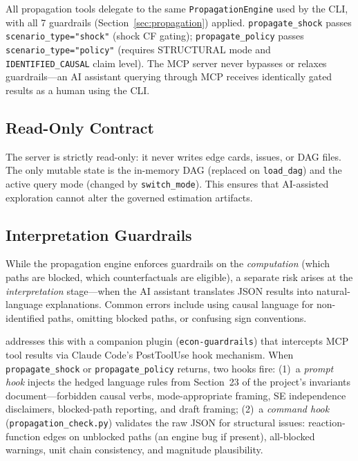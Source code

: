 \documentclass{article}
\begin{document}
All propagation tools delegate to the same \texttt{PropagationEngine} used by the CLI, with all 7 guardrails (Section~\ref{sec:propagation}) applied. \texttt{propagate\_shock} passes \texttt{scenario\_type="shock"} (shock CF gating); \texttt{propagate\_policy} passes \texttt{scenario\_type="policy"} (requires STRUCTURAL mode and \texttt{IDENTIFIED\_CAUSAL} claim level). The MCP server never bypasses or relaxes guardrails---an AI assistant querying through MCP receives identically gated results as a human using the CLI.

\subsection{Read-Only Contract}

The server is strictly read-only: it never writes edge cards, issues, or DAG files. The only mutable state is the in-memory DAG (replaced on \texttt{load\_dag}) and the active query mode (changed by \texttt{switch\_mode}). This ensures that AI-assisted exploration cannot alter the governed estimation artifacts.

\subsection{Interpretation Guardrails}

While the propagation engine enforces guardrails on the \emph{computation} (which paths are blocked, which counterfactuals are eligible), a separate risk arises at the \emph{interpretation} stage---when the AI assistant translates JSON results into natural-language explanations. Common errors include using causal language for non-identified paths, omitting blocked paths, or confusing sign conventions.

\oc{} addresses this with a companion plugin (\texttt{econ-guardrails}) that intercepts MCP tool results via Claude Code's PostToolUse hook mechanism. When \texttt{propagate\_shock} or \texttt{propagate\_policy} returns, two hooks fire: (1)~a \emph{prompt hook} injects the hedged language rules from Section~23 of the project's invariants document---forbidden causal verbs, mode-appropriate framing, SE independence disclaimers, blocked-path reporting, and draft framing; (2)~a \emph{command hook} (\texttt{propagation\_check.py}) validates the raw JSON for structural issues: reaction-function edges on unblocked paths (an engine bug if present), all-blocked warnings, unit chain consistency, and magnitude plausibility.
\end{document}
